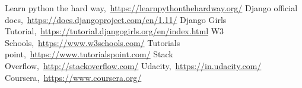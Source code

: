 {}
{}
\begin{thebibliography}{99}

\bibitem{}Learn python the hard way,\ \url{https://learnpythonthehardway.org/}
\bibitem{}Django official docs,\ \url{https://docs.djangoproject.com/en/1.11/}
\bibitem{}Django Girls Tutorial,\ \url{https://tutorial.djangogirls.org/en/index.html}
\bibitem{}W3 Schools,\ \url{https://www.w3schools.com/}
\bibitem{}Tutorials point,\ \url{https://www.tutorialspoint.com/}
\bibitem{}Stack Overflow,\ \url{http://stackoverflow.com/}
\bibitem{}Udacity,\ \url{https://in.udacity.com/}
\bibitem{}Coursera,\ \url{https://www.coursera.org/}

\end{thebibliography}
